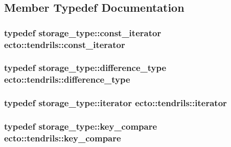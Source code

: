 \subsection{Member Typedef Documentation}
\hypertarget{classecto_1_1tendrils_a86df9983555ca4ebdae8b1d36aa4bbd8}{
\subsubsection[{const\-\_\-iterator}]{\setlength{\rightskip}{0pt plus 5cm}typedef storage\-\_\-type\-::const\-\_\-iterator {\bf ecto\-::tendrils\-::const\-\_\-iterator}}}\label{classecto_1_1tendrils_a86df9983555ca4ebdae8b1d36aa4bbd8}
\hypertarget{classecto_1_1tendrils_a919b9a4666ad641148b6a432a1fd08fb}{
\subsubsection[{difference\-\_\-type}]{\setlength{\rightskip}{0pt plus 5cm}typedef storage\-\_\-type\-::difference\-\_\-type {\bf ecto\-::tendrils\-::difference\-\_\-type}}}\label{classecto_1_1tendrils_a919b9a4666ad641148b6a432a1fd08fb}
\hypertarget{classecto_1_1tendrils_a6f0b7bd6e3a03f047351303630b889e0}{
\subsubsection[{iterator}]{\setlength{\rightskip}{0pt plus 5cm}typedef storage\-\_\-type\-::iterator {\bf ecto\-::tendrils\-::iterator}}}\label{classecto_1_1tendrils_a6f0b7bd6e3a03f047351303630b889e0}
\hypertarget{classecto_1_1tendrils_aa347bebda44153437e8554a25bed9e6b}{
\subsubsection[{key\-\_\-compare}]{\setlength{\rightskip}{0pt plus 5cm}typedef storage\-\_\-type\-::key\-\_\-compare {\bf ecto\-::tendrils\-::key\-\_\-compare}}}\label{classecto_1_1tendrils_aa347bebda44153437e8554a25bed9e6b}
